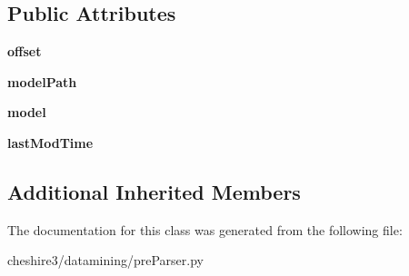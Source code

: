 \subsection*{Public Attributes}
\begin{DoxyCompactItemize}
\item 
\hypertarget{classcheshire3_1_1datamining_1_1pre_parser_1_1_vector_un_renumber_pre_parser_aca1f8733ef556a3fea16504745ac2473}{{\bfseries offset}}\label{classcheshire3_1_1datamining_1_1pre_parser_1_1_vector_un_renumber_pre_parser_aca1f8733ef556a3fea16504745ac2473}

\item 
\hypertarget{classcheshire3_1_1datamining_1_1pre_parser_1_1_vector_un_renumber_pre_parser_a6f4a3bc4cf25992c7058382d569aa8f3}{{\bfseries model\-Path}}\label{classcheshire3_1_1datamining_1_1pre_parser_1_1_vector_un_renumber_pre_parser_a6f4a3bc4cf25992c7058382d569aa8f3}

\item 
\hypertarget{classcheshire3_1_1datamining_1_1pre_parser_1_1_vector_un_renumber_pre_parser_ad2ca924d88ff0430df96f4abc5180f0c}{{\bfseries model}}\label{classcheshire3_1_1datamining_1_1pre_parser_1_1_vector_un_renumber_pre_parser_ad2ca924d88ff0430df96f4abc5180f0c}

\item 
\hypertarget{classcheshire3_1_1datamining_1_1pre_parser_1_1_vector_un_renumber_pre_parser_a750b9627e59112d1551cedb0423a1162}{{\bfseries last\-Mod\-Time}}\label{classcheshire3_1_1datamining_1_1pre_parser_1_1_vector_un_renumber_pre_parser_a750b9627e59112d1551cedb0423a1162}

\end{DoxyCompactItemize}
\subsection*{Additional Inherited Members}


The documentation for this class was generated from the following file\-:\begin{DoxyCompactItemize}
\item 
cheshire3/datamining/pre\-Parser.\-py\end{DoxyCompactItemize}
